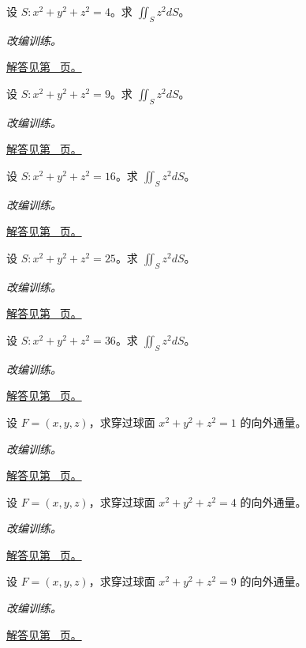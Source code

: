 \documentclass[12pt,fontset=fandol]{ctexart}
\begin{document}
\begin{example}[球面的二次函数积分]\label{ex:c43q8}
设 $S:x^2+y^2+z^2=4$。求 $\displaystyle\iint_Sz^2dS$。
\par\textit{改编训练。}\par\hyperref[ans:c43q8]{解答见第~\pageref{ans:c43q8} 页。}
\end{example}
\begin{example}[球面的二次函数积分]\label{ex:c43q9}
设 $S:x^2+y^2+z^2=9$。求 $\displaystyle\iint_Sz^2dS$。
\par\textit{改编训练。}\par\hyperref[ans:c43q9]{解答见第~\pageref{ans:c43q9} 页。}
\end{example}
\begin{example}[球面的二次函数积分]\label{ex:c43q10}
设 $S:x^2+y^2+z^2=16$。求 $\displaystyle\iint_Sz^2dS$。
\par\textit{改编训练。}\par\hyperref[ans:c43q10]{解答见第~\pageref{ans:c43q10} 页。}
\end{example}
\begin{example}[球面的二次函数积分]\label{ex:c43q11}
设 $S:x^2+y^2+z^2=25$。求 $\displaystyle\iint_Sz^2dS$。
\par\textit{改编训练。}\par\hyperref[ans:c43q11]{解答见第~\pageref{ans:c43q11} 页。}
\end{example}
\begin{example}[球面的二次函数积分]\label{ex:c43q12}
设 $S:x^2+y^2+z^2=36$。求 $\displaystyle\iint_Sz^2dS$。
\par\textit{改编训练。}\par\hyperref[ans:c43q12]{解答见第~\pageref{ans:c43q12} 页。}
\end{example}
\begin{example}[散度定理计算球面通量]\label{ex:c43q13}
设 $F=(x,y,z)$，求穿过球面 $x^2+y^2+z^2=1$ 的向外通量。
\par\textit{改编训练。}\par\hyperref[ans:c43q13]{解答见第~\pageref{ans:c43q13} 页。}
\end{example}
\begin{example}[散度定理计算球面通量]\label{ex:c43q14}
设 $F=(x,y,z)$，求穿过球面 $x^2+y^2+z^2=4$ 的向外通量。
\par\textit{改编训练。}\par\hyperref[ans:c43q14]{解答见第~\pageref{ans:c43q14} 页。}
\end{example}
\begin{example}[散度定理计算球面通量]\label{ex:c43q15}
设 $F=(x,y,z)$，求穿过球面 $x^2+y^2+z^2=9$ 的向外通量。
\par\textit{改编训练。}\par\hyperref[ans:c43q15]{解答见第~\pageref{ans:c43q15} 页。}
\end{example}
\end{document}
